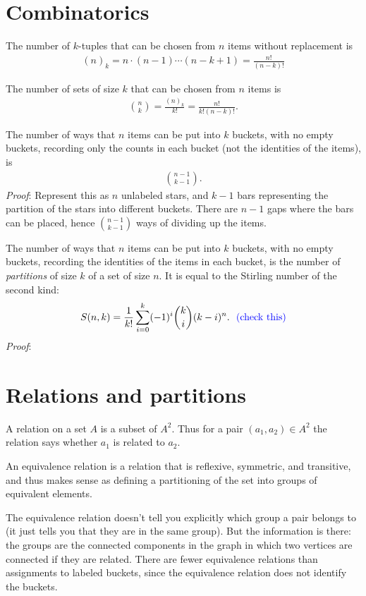\section{Combinatorics}
The number of $k$-tuples that can be chosen from $n$ items without
replacement is
\begin{align*}
  (n)_k = n \cdot (n-1) \cdots (n - k + 1) = \frac{n!}{(n-k)!}
\end{align*}

The number of sets of size $k$ that can be chosen from $n$ items is
\begin{align*}
  {n \choose k} = \frac{(n)_k}{k!} = \frac{n!}{k!(n-k)!}.
\end{align*}

The number of ways that $n$ items can be put into $k$ buckets, with no empty
buckets, recording only the counts in each bucket (not the identities of the
items), is
\begin{align*}
  {n-1 \choose k -1}.
\end{align*}
\textit{Proof}: Represent this as $n$ unlabeled stars, and $k-1$ bars
representing the partition of the stars into different buckets. There are $n-1$
gaps where the bars can be placed, hence ${n-1 \choose k -1}$ ways of dividing
up the items.

The number of ways that $n$ items can be put into $k$ buckets, with no empty
buckets, recording the identities of the items in each bucket, is the number of
\textit{partitions} of size $k$ of a set of size $n$. It is equal to the
Stirling number of the second kind:
\begin{align*}
  S(n, k) = \frac{1}{k!} \sum_{i=0}^k(-1)^i{k \choose i}(k-i)^n. ~~ \textcolor{blue}{\text{(check this)}}
\end{align*}
\textit{Proof}:

\section{Relations and partitions}
A relation on a set $A$ is a subset of $A^2$. Thus for a pair
$(a_1, a_2) \in A^2$ the relation says whether $a_1$ is related to $a_2$.

An equivalence relation is a relation that is reflexive, symmetric, and
transitive, and thus makes sense as defining a partitioning of the set into
groups of equivalent elements.

The equivalence relation doesn't tell you explicitly which group a pair belongs
to (it just tells you that they are in the same group). But the information is
there: the groups are the connected components in the graph in which two
vertices are connected if they are related. There are fewer equivalence
relations than assignments to labeled buckets, since the equivalence relation
does not identify the buckets. 


